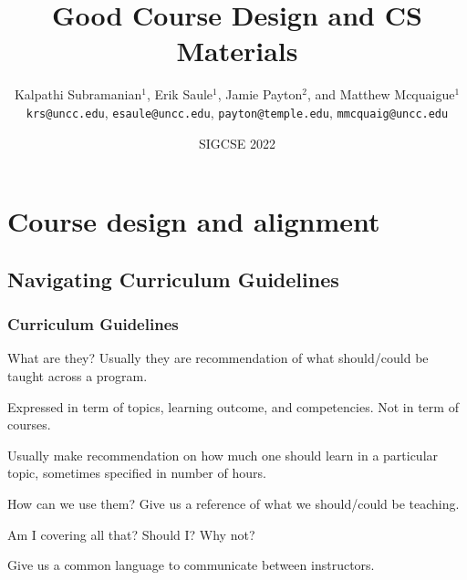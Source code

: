 \documentclass[aspectratio=169]{beamer}
\title{Good Course Design and CS Materials}
\subtitle{}
\author{Kalpathi Subramanian$^1$, Erik Saule$^1$, Jamie Payton$^2$, and Matthew Mcquaigue$^1$ \\\texttt{krs@uncc.edu}, \texttt{esaule@uncc.edu}, \texttt{payton@temple.edu}, \texttt{mmcquaig@uncc.edu}}
\institute{$^1$The University of North Carolina at Charlotte\\$^2$Temple University}
\date{SIGCSE 2022}
\begin{document}
\begin{frame}
\titlepage
\end{frame}



%
%
%
%
%
%


\section{Course design and alignment}

\subsection{Navigating Curriculum Guidelines}



\begin{frame}
  \frametitle{Curriculum Guidelines}

  \begin{block}{What are they?}
    Usually they are recommendation of what should/could be taught across a program.

    Expressed in term of topics, learning outcome, and competencies. Not in term of courses.

    Usually make recommendation on how much one should learn in a
    particular topic, sometimes specified in number of hours.
  \end{block}


  \begin{block}{How can we use them?}
    Give us a reference of what we should/could be teaching.

    Am I covering all that? Should I? Why not?

    Give us a common language to communicate between instructors.
  \end{block}
\end{frame}
\end{document}
